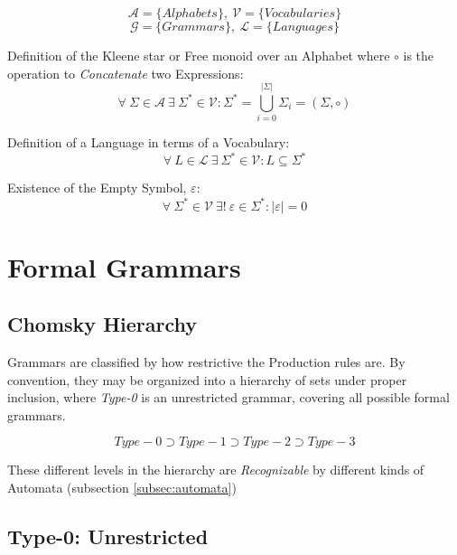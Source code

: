 \documentclass{article}
\begin{document}
\[
    \mathcal{A} = \{ Alphabets \},\: \mathcal{V} = \{ Vocabularies \}
\] \[
    \mathcal{G} = \{ Grammars \},\: \mathcal{L} = \{ Languages \}
\]

    \begin{description}

    \item Definition of the Kleene star or Free monoid over an
      Alphabet where $\circ$ is the operation to \emph{Concatenate} two
      Expressions:
    \[
        \forall \: \Sigma \in \mathcal{A} \:
        \exists \: \Sigma^* \in \mathcal{V}
        : \Sigma^* = \bigcup_{i=0}^{|\Sigma|} \Sigma_i
        = (\Sigma,\circ)
    \]

    \item Definition of a Language in terms of a Vocabulary:
    \[
        \forall \: L \in \mathcal{L} \:
        \exists \: \Sigma^* \in \mathcal{V}
        : L \subseteq \Sigma^*
    \]

    \item Existence of the Empty Symbol, $\varepsilon$:
    \[
        \forall \: \Sigma^* \in \mathcal{V} \:
        \exists ! \: \varepsilon \in \Sigma^*
        : |\varepsilon|=0
    \]

    \end{description}

\section{Formal Grammars}

\subsection{Chomsky Hierarchy}

Grammars are classified by how restrictive the Production rules
are. By convention, they may be organized into a hierarchy of sets
under proper inclusion, where \emph{Type-0} is an unrestricted grammar,
covering all possible formal grammars.

\[
    Type-0 \supset Type-1 \supset Type-2 \supset Type-3
\]

These different levels in the hierarchy are \emph{Recognizable} by
different kinds of Automata (subsection \ref{subsec:automata})

\subsection{Type-0: Unrestricted}
\end{document}
